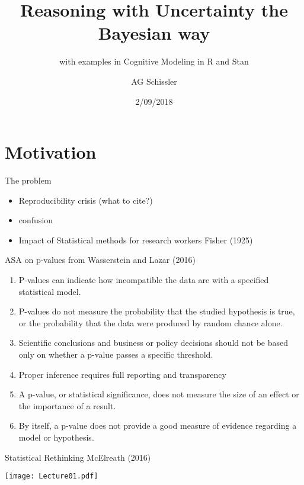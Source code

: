 \documentclass[ignorenonframetext,]{beamer}
\title{Reasoning with Uncertainty the Bayesian way}
\subtitle{with examples in Cognitive Modeling in R and Stan}
\author{AG Schissler}
\date{2/09/2018}
\providecommand{\tightlist}{%
  \setlength{\itemsep}{0pt}\setlength{\parskip}{0pt}}
\begin{document}
\frame{\titlepage}

\begin{frame}
\tableofcontents[hideallsubsections]
\end{frame}
\hypertarget{motivation}{%
\section{Motivation}\label{motivation}}

\begin{frame}{%
\protect\hypertarget{the-problem}{%
The problem}}

\begin{itemize}
\tightlist
\item
  Reproducibility crisis (what to cite?)
\item
  confusion
\item
  Impact of Statistical methods for research workers Fisher (1925)
\end{itemize}

\end{frame}

\begin{frame}{%
\protect\hypertarget{asa-on-p-values-from-wasserstein2016}{%
ASA on p-values from Wasserstein and Lazar (2016)}}

\begin{enumerate}
[1.]
\tightlist
\item
  P-values can indicate how incompatible the data are with a specified
  statistical model.
\item
  P-values do not measure the probability that the studied hypothesis is
  true, or the probability that the data were produced by random chance
  alone.
\item
  Scientific conclusions and business or policy decisions should not be
  based only on whether a p-value passes a specific threshold.
\item
  Proper inference requires full reporting and transparency
\item
  A p-value, or statistical significance, does not measure the size of
  an effect or the importance of a result.
\item
  By itself, a p-value does not provide a good measure of evidence
  regarding a model or hypothesis.
\end{enumerate}

\end{frame}

\begin{frame}{%
\protect\hypertarget{statistical-rethinking-mcelreath2016}{%
Statistical Rethinking McElreath (2016)}}

\texttt{[image: Lecture01.pdf]}

\end{frame}
\end{document}
